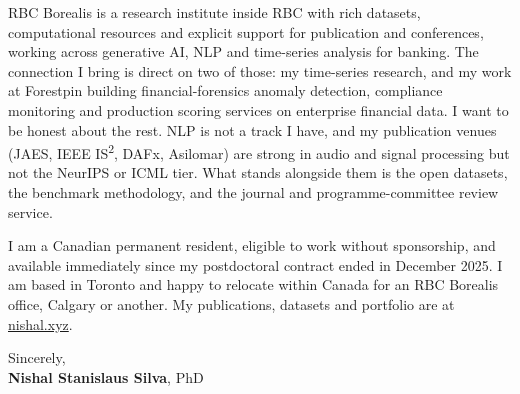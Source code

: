 \documentclass[11pt]{article}
\newcommand{\clName}{Nishal Stanislaus Silva}
\newcommand{\clSite}{https://nishal.xyz}
\begin{document}
RBC Borealis is a research institute inside RBC with rich datasets, computational resources and explicit support for publication and conferences, working across generative AI, NLP and time-series analysis for banking. The connection I bring is direct on two of those: my time-series research, and my work at Forestpin building financial-forensics anomaly detection, compliance monitoring and production scoring services on enterprise financial data. I want to be honest about the rest. NLP is not a track I have, and my publication venues (JAES, IEEE IS\textsuperscript{2}, DAFx, Asilomar) are strong in audio and signal processing but not the NeurIPS or ICML tier. What stands alongside them is the open datasets, the benchmark methodology, and the journal and programme-committee review service.

I am a Canadian permanent resident, eligible to work without sponsorship, and available immediately since my postdoctoral contract ended in December 2025. I am based in Toronto and happy to relocate within Canada for an RBC Borealis office, Calgary or another. My publications, datasets and portfolio are at \href{\clSite}{nishal.xyz}.

\vspace{10pt}
Sincerely,\\[2pt]
\textbf{\clName}, PhD
\end{document}
